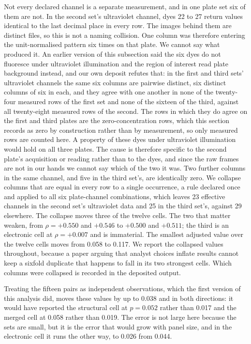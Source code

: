 \documentclass[11pt,a4paper]{article}
\begin{document}
Not every declared channel is a separate measurement, and in one plate set six of
them are not. In the second set's ultraviolet channel, dyes 22 to 27 return
values identical to the last decimal place in every row. The images behind them
are distinct files, so this is not a naming collision. One column was therefore
entering the unit-normalised pattern six times on that plate. We cannot say
what produced it. An earlier version of this subsection said the six dyes do
not fluoresce under ultraviolet illumination and the region of interest read
plate background instead, and our own deposit refutes that: in the first and
third sets' ultraviolet channels the same six columns are pairwise distinct,
six distinct columns of six in each, and they agree with one another in none of
the twenty-four measured rows of the first set and none of the sixteen of the
third, against all twenty-eight measured rows of the second. The rows in which
they do agree on the first and third plates are the zero-concentration rows,
which this section records as zero by construction rather than by measurement,
so only measured rows are counted here. A property of these dyes under ultraviolet
illumination would hold on all three plates. The cause is therefore specific to
the second plate's acquisition or reading rather than to the dyes, and since the
raw frames are not in our hands we cannot say which of the two it was. Two further columns in the same channel, and five
in the third set's, are identically zero. We collapse columns that are equal in
every row to a single occurrence, a rule declared once and applied to all six
plate-channel combinations, which leaves 23 effective channels in the second
set's ultraviolet data and 25 in the third set's, against 29 elsewhere. The
collapse moves three of the twelve cells. The two that matter weaken, from
$\rho = +0.550$ and $+0.546$ to $+0.500$ and $+0.511$; the third is an
electronic cell at $\rho = +0.007$ and is immaterial. The smallest adjusted
value over the twelve cells moves from 0.058 to 0.117. We report the collapsed values throughout, because a
paper arguing that analyst choices inflate results cannot keep a sixfold
duplicate that happens to fall in its two strongest cells. Which columns were
collapsed is recorded in the deposited output.

Treating the fifteen pairs as independent observations, which the first version
of this analysis did, moves these values by up to 0.038 and in both directions:
it would have reported the structural cell at $p = 0.052$ rather than 0.017 and
the merged cell at 0.058 rather than 0.019. The error is not large here
because the sets are small, but it is the error that would grow with panel size,
and in the electronic cell it runs the other way, to 0.026 from 0.044.
\end{document}
